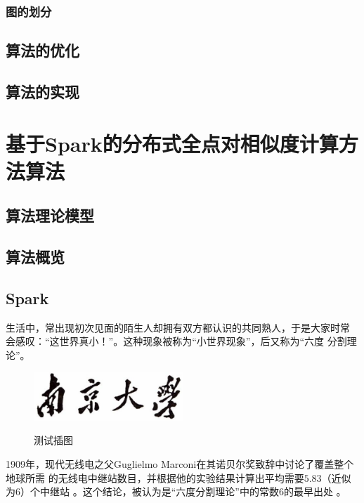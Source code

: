 \documentclass[master]{njuthesis}
\begin{document}
\subsection{图的划分}
\section{算法的优化}

\section{算法的实现}


\chapter{基于Spark的分布式全点对相似度计算方法算法}\label{chapter_allSimRank}
\section{算法理论模型}
\section{算法概览}

\section{Spark}


生活中，常出现初次见面的陌生人却拥有双方都认识的共同熟人，于是大家时常
会感叹：“这世界真小！”。这种现象被称为``小世界现象''，后又称为``六度
分割理论''。

\begin{figure}[htbp]
  \centering
  \includegraphics[width= 0.5\textwidth]{njuname.eps}\\
  \caption{测试插图}\label{fig:test2}
\end{figure}

1909年，现代无线电之父Guglielmo Marconi在其诺贝尔奖致辞中讨论了覆盖整个地球所需
的无线电中继站数目，并根据他的实验结果计算出平均需要$5.83$（近似为$6$）个中继站
\cite{marconi1909nobel}。这个结论，被认为是``六度分割理论''中的常数$6$的最早出处
\cite{barabasi2003linked}。
\end{document}
